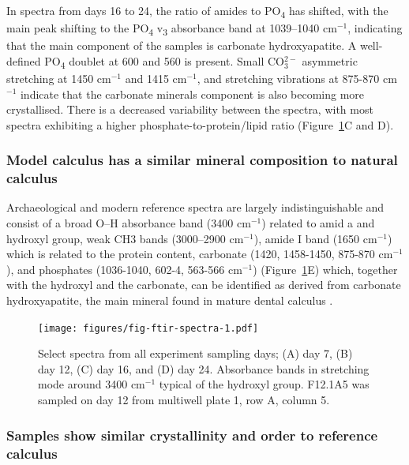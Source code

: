 \documentclass[10pt,a4paper]{article}
\begin{document}
In spectra from days 16 to 24, the ratio of amides to
PO\textsubscript{4} has shifted, with the main peak shifting to the
PO\textsubscript{4} v\textsubscript{3} absorbance band at 1039--1040
cm\(^{-1}\), indicating that the main component of the samples is
carbonate hydroxyapatite. A well-defined PO\textsubscript{4} doublet at
600 and 560 is present. Small CO\(_3^{2-}\) asymmetric stretching at
1450 cm\(^{-1}\) and 1415 cm\(^{-1}\), and stretching vibrations at
875-870 cm\(^{-1}\) indicate that the carbonate minerals component is
also becoming more crystallised. There is a decreased variability
between the spectra, with most spectra exhibiting a higher
phosphate-to-protein/lipid ratio (Figure~\ref{fig-ftir-spectra}C and D).

\subsubsection*{Model calculus has a similar mineral composition to
natural
calculus}\label{model-calculus-has-a-similar-mineral-composition-to-natural-calculus}

Archaeological and modern reference spectra are largely
indistinguishable and consist of a broad O--H absorbance band (3400
cm\(^{-1}\)) related to amid a and hydroxyl group, weak CH3 bands
(3000--2900 cm\(^{-1}\)), amide I band (1650 cm\(^{-1}\)) which is
related to the protein content, carbonate (1420, 1458-1450, 875-870
cm\(^{-1}\)), and phosphates (1036-1040, 602-4, 563-566 cm\(^{-1}\))
(Figure~\ref{fig-ftir-spectra}E) which, together with the hydroxyl and
the carbonate, can be identified as derived from carbonate
hydroxyapatite, the main mineral found in mature dental calculus
\citep{hayashizakiSiteSpecific2008, jinSupragingivalCalculus2002}.

\begin{figure}
    \centering
    \texttt{[image: figures/fig-ftir-spectra-1.pdf]}
    \caption{\label{fig-ftir-spectra}Select spectra from all experiment
sampling days; (A) day 7, (B) day 12, (C) day 16, and (D) day 24.
Absorbance bands in stretching mode around 3400 cm\(^{-1}\) typical of the
hydroxyl group. F12.1A5 was sampled on day 12 from multiwell plate 1, row A, column 5.}
\end{figure}

\subsubsection*{Samples show similar crystallinity and order to reference
calculus}\label{samples-show-similar-crystallinity-and-order-to-reference-calculus}
\end{document}

